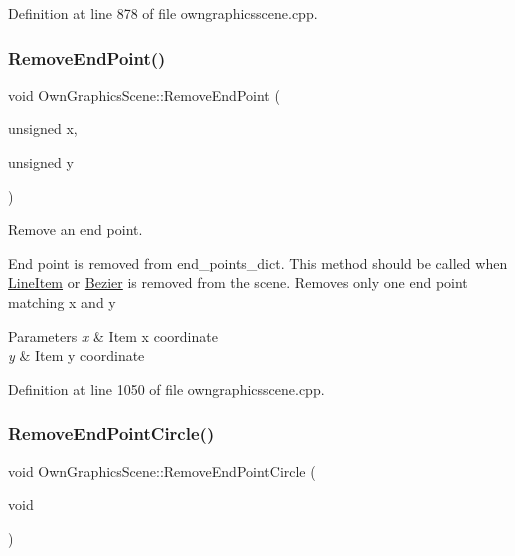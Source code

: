 Definition at line 878 of file owngraphicsscene.\+cpp.

\mbox{\label{classOwnGraphicsScene_a4f029a37e96fc022295ce4e421319ddf}} 
\subsubsection{\texorpdfstring{Remove\+End\+Point()}{RemoveEndPoint()}}
{\footnotesize\ttfamily void Own\+Graphics\+Scene\+::\+Remove\+End\+Point (\begin{DoxyParamCaption}\item[{unsigned}]{x,  }\item[{unsigned}]{y }\end{DoxyParamCaption})}



Remove an end point. 

End point is removed from end\+\_\+points\+\_\+dict. This method should be called when \mbox{\hyperlink{classLineItem}{Line\+Item}} or \mbox{\hyperlink{classBezier}{Bezier}} is removed from the scene. Removes only one end point matching x and y 
\begin{DoxyParams}{Parameters}
{\em x} & Item x coordinate \\
\hline
{\em y} & Item y coordinate \\
\hline
\end{DoxyParams}


Definition at line 1050 of file owngraphicsscene.\+cpp.

\mbox{\label{classOwnGraphicsScene_a4b1ba1b97b89baad08c3ba5471ebb61f}} 
\subsubsection{\texorpdfstring{Remove\+End\+Point\+Circle()}{RemoveEndPointCircle()}}
{\footnotesize\ttfamily void Own\+Graphics\+Scene\+::\+Remove\+End\+Point\+Circle (\begin{DoxyParamCaption}\item[{void}]{ }\end{DoxyParamCaption})}



